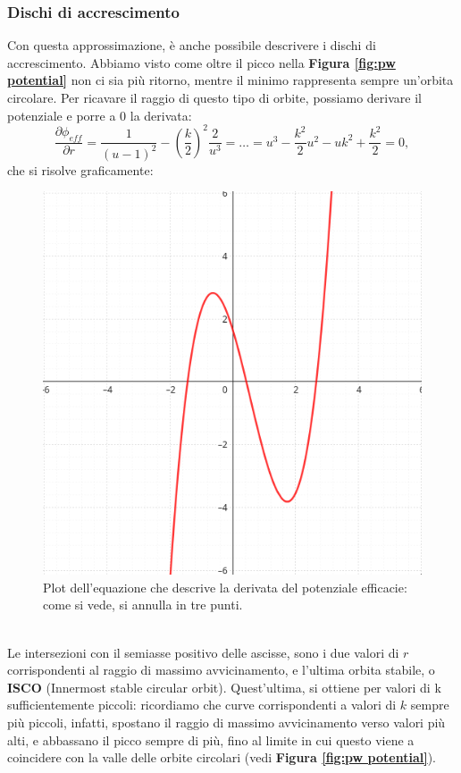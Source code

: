 \subsubsection{Dischi di accrescimento}
Con questa approssimazione, è anche possibile descrivere i dischi di accrescimento.
Abbiamo visto come oltre il picco nella \textbf{Figura \ref{fig:pw potential}} non ci sia più ritorno, mentre il minimo rappresenta sempre un'orbita circolare.
Per ricavare il raggio di questo tipo di orbite, possiamo derivare il potenziale e porre a $0$ la derivata:
\begin{equation}
    \frac{\partial\phi_{eff}}{\partial r}=
    \frac{1}{(u-1)^2} - \left( \frac{k}{2}\right)^2\frac{2}{u^3} = \dots= u^3 - \frac{k^2}{2} u^2 -uk^2+\frac{k^2}{2} =0,  
    \label{eq: derivata potenziale efficacie}
\end{equation}
che si risolve graficamente:
\begin{figure}[h!]
    \centering
    \includegraphics[width=0.6\linewidth]{Immagini/soluzione_grafica_pot_efficacie.png}
    \caption{Plot dell'equazione che descrive la derivata del potenziale efficacie: come si vede, si annulla in tre punti.}
    \label{fig:e derivata potenziale efficacie}
\end{figure}\\
Le intersezioni con il semiasse positivo delle ascisse, sono i due valori di $r$ corrispondenti al raggio di massimo avvicinamento, e l'ultima orbita stabile, o \textbf{ISCO} (Innermost stable circular orbit).
Quest'ultima, si ottiene per valori di k sufficientemente piccoli: ricordiamo che curve corrispondenti a valori di $k$ sempre più piccoli, infatti, spostano il raggio di massimo avvicinamento verso valori più alti, e abbassano il picco sempre di più, fino al limite in cui questo viene a coincidere con la valle delle orbite circolari (vedi \textbf{Figura \ref{fig:pw potential}}).  
